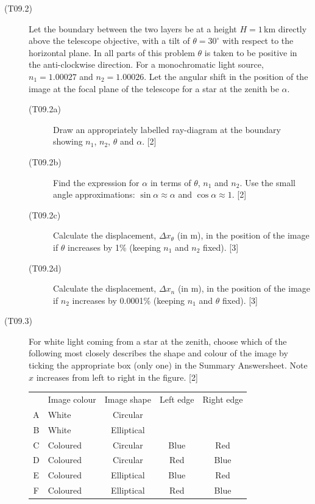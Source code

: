 \begin{description}
\item[(T09.2)] Let the boundary between the two layers be at a height
  $H = 1$\,km directly above the telescope objective, with a tilt of
  $\theta = 30^\circ$ with respect to the horizontal plane. In all parts of
  this problem $\theta$ is taken to be positive in the anti-clockwise
  direction. For a monochromatic light source, $n_1 = 1.00027$ and
  $n_2 = 1.00026$. Let the angular shift in the position of the image at the
  focal plane of the telescope for a star at the zenith be $\alpha$.
  \begin{description}
  \item[(T09.2a)] Draw an appropriately labelled ray-diagram at the boundary
    showing $n_1$, $n_2$, $\theta$ and $\alpha$. \hfill[2]
  \item[(T09.2b)] Find the expression for $\alpha$ in terms of $\theta$,
    $n_1$ and $n_2$. Use the small angle approximations:
    $\sin\alpha \approx \alpha$ and $\cos\alpha \approx 1$. \hfill[2]
  \item[(T09.2c)] Calculate the displacement, $\Delta x_\theta$ (in m), in
    the position of the image if $\theta$ increases by 1\% (keeping $n_1$
    and $n_2$ fixed). \hfill[3]
  \item[(T09.2d)] Calculate the displacement, $\Delta x_n$ (in m), in the
    position of the image if $n_2$ increases by 0.0001\% (keeping $n_1$ and
    $\theta$ fixed). \hfill[3]
  \end{description}
\item[(T09.3)] For white light coming from a star at the zenith, choose
  which of the following most closely describes the shape and colour of the
  image by ticking the appropriate box (only one) in the Summary
  Answersheet. Note $x$ increases from left to right in the figure.
  \hfill[2]

  \begin{tabular}{clccc}
  & Image colour & Image shape & Left edge & Right edge \\
  A & White & Circular & & \\
  B & White & Elliptical & & \\
  C & Coloured & Circular & Blue & Red \\
  D & Coloured & Circular & Red & Blue \\
  E & Coloured & Elliptical & Blue & Red \\
  F & Coloured & Elliptical & Red & Blue \\
  \end{tabular}
\end{description}

